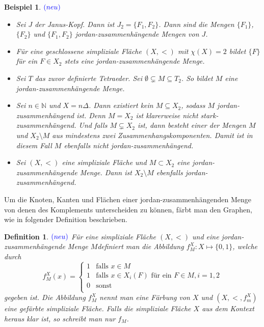 \documentclass[12pt,titlepage]{article}
\newtheorem{bsp}{Beispiel}[section]
\newtheorem{definition}{Definition}[section]
\begin{document}
\begin{bsp}$\textcolor{blue}{(neu)}$
\begin{itemize}
\item Sei $J$ der Janus-Kopf. Dann ist $J_2=\{F_1,F_2\}$. Dann sind die Mengen $\{F_1\}$,$\{F_2\}$ und $\{F_1,F_2\}$ jordan-zusammenhängende Mengen von $J$.
\item Für eine geschlossene simpliziale Fläche $(X,<)$ mit $\chi(X)=2$ bildet $\{F\}$ für ein $F \in X_2$ stets eine jordan-zusammenhängende Menge.
\item Sei $T$ das zuvor definierte Tetraeder. Sei $\emptyset \subsetneq M \subseteq T_2$. So bildet $M$ eine jordan-zusammenhängende Menge.
\item Sei $n\in \mathbb{N}$ und $X=n \Delta$. Dann existiert kein $M \subseteq X_2$, sodass $M$ jordan-zusammenhängend ist. Denn $ M = X_2$ ist klarerweise nicht stark-zusammenhängend. Und falls $M \subsetneq X_2$ ist, dann besteht einer der Mengen $M$ und $X_2\setminus M$ aus mindestens zwei Zusammenhangskomponenten. Damit ist in diesem Fall $M$ ebenfalls nicht jordan-zusammenhängend.
\item Sei $(X,<)$ eine simpliziale Fläche und $M \subset X_2$ eine jordan-zusammenhängende Menge. Dann ist $X_2\setminus M$ ebenfalls jordan-zusammenhängend.
\end{itemize}
\end{bsp}
Um die Knoten, Kanten und Flächen einer jordan-zusammenhängenden Menge von denen des Komplements unterscheiden zu können, färbt man den Graphen, wie in folgender Definition beschrieben.

\begin{definition}$\textcolor{blue}{(neu)}$
Für eine simpliziale Fläche $(X,<)$ und eine jordan-zusammenhängende Menge $M$definiert man die Abbildung $f_M^X:X \mapsto\{0,1\}$, welche durch
\[
f^X_M(x)=\begin{cases}
1 & \text{falls } x\in M\\
1 & \text{falls } x \in X_i(F) \text{ für ein }F \in M ,i=1,2\\
0 &\text{sonst}\\

\end{cases}
\]
gegeben ist.
Die Abbildung $f_M^X$ nennt man eine \emph{Färbung} von $X$ und $(X,<,f_m^X)$ eine gefärbte simpliziale Fläche. Falls die simpliziale Fläche $X$ aus dem Kontext heraus klar ist, so schreibt man nur $f_M$.
\end{definition}
\end{document}
